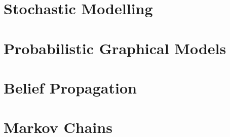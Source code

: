 \section{Stochastic Modelling}

\section{Probabilistic Graphical Models}

\section{Belief Propagation}

\section{Markov Chains}

